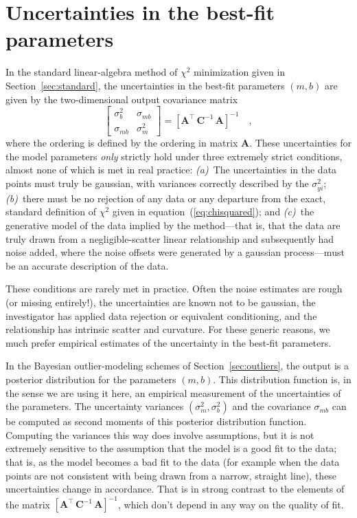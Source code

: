 \documentclass[12pt,twoside]{article}
\newcommand{\sectionname}{Section}
\newcommand{\equationname}{equation}
\newcommand{\mmatrix}[1]{\boldsymbol{#1}}
\newcommand{\inverse}[1]{{#1}^{-1}}
\newcommand{\transpose}[1]{{#1}^{\scriptscriptstyle \top}}
\newcommand{\mA}{\mmatrix{A}}
\newcommand{\mAT}{\transpose{\mA}}
\newcommand{\mC}{\mmatrix{C}}
\newcommand{\mCinv}{\inverse{\mC}}
\begin{document}
\section{Uncertainties in the best-fit parameters}\label{sec:uncertainty}

In the standard linear-algebra method of $\chi^2$ minimization given
in \sectionname~\ref{sec:standard}, the uncertainties in the best-fit
parameters $(m,b)$ are given by the two-dimensional output covariance
matrix
\begin{equation}
\left[\begin{array}{cc}
\sigma_{b}^2 & \sigma_{mb} \\
\sigma_{mb} & \sigma_{m}^2
\end{array}\right] = \inverse{\left[\mAT\,\mCinv\,\mA\right]} \quad ,
\end{equation}
where the ordering is defined by the ordering in matrix $\mA$.  These
uncertainties for the model parameters \emph{only} strictly hold under
three extremely strict conditions, almost none of which is met in real
practice: \textsl{(a)}~The uncertainties in the data points must truly
be gaussian, with variances correctly described by the
$\sigma_{yi}^2$; \textsl{(b)}~there must be no rejection of any data
or any departure from the exact, standard definition of $\chi^2$ given
in \equationname~(\ref{eq:chisquared}); and \textsl{(c)}~the
generative model of the data implied by the method---that is, that the
data are truly drawn from a negligible-scatter linear relationship and
subsequently had noise added, where the noise offsets were generated
by a gaussian process---must be an accurate description of the data.

These conditions are rarely met in practice.  Often the noise
estimates are rough (or missing entirely!), the uncertainties are
known not to be gaussian, the investigator has applied data rejection
or equivalent conditioning, and the relationship has intrinsic scatter
and curvature.  For these generic reasons, we much prefer empirical
estimates of the uncertainty in the best-fit parameters.

In the Bayesian outlier-modeling schemes of
\sectionname~\ref{sec:outliers}, the output is a posterior
distribution for the parameters $(m,b)$.  This distribution function
is, in the sense we are using it here, an empirical measurement of the
uncertainties of the parameters.  The uncertainty variances
$(\sigma_m^2,\sigma_b^2)$ and the covariance $\sigma_{mb}$ can be
computed as second moments of this posterior distribution function.
Computing the variances this way does involve assumptions, but it is
not extremely sensitive to the assumption that the model is a good fit
to the data; that is, as the model becomes a bad fit to the data (for
example when the data points are not consistent with being drawn from
a narrow, straight line), these uncertainties change in accordance.
That is in strong contrast to the elements of the matrix
$\inverse{\left[\mAT\,\mCinv\,\mA\right]}$, which don't depend in any
way on the quality of fit.
\end{document}
